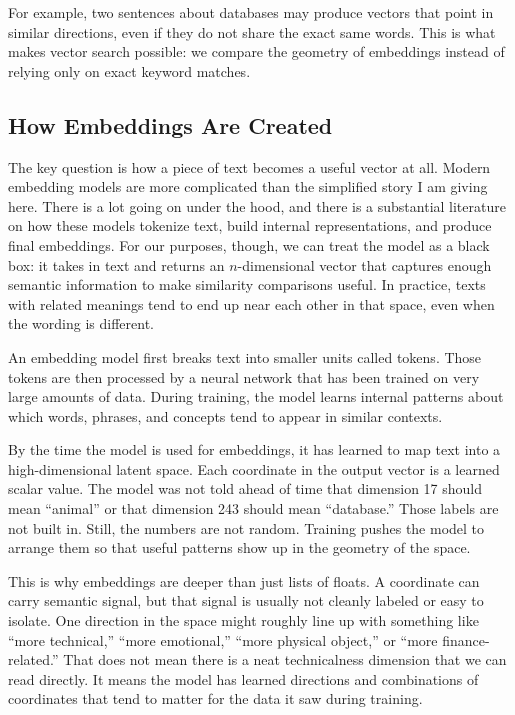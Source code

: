 \documentclass[12pt]{article}
\begin{document}
For example, two sentences about databases may produce vectors that point
in similar directions, even if they do not share the exact same words.
This is what makes vector search possible: we compare the geometry of
embeddings instead of relying only on exact keyword matches.

\subsection{How Embeddings Are Created}

The key question is how a piece of text becomes a useful vector at all.
Modern embedding models are more complicated than the simplified story I
am giving here. There is a lot going on under the hood, and there is a
substantial literature on how these models tokenize text, build internal
representations, and produce final embeddings. For our purposes, though,
we can treat the model as a black box: it takes in text and returns an
$n$-dimensional vector that captures enough semantic information to make
similarity comparisons useful. In practice, texts with related meanings
tend to end up near each other in that space, even when the wording is
different.

An embedding model first breaks text into smaller units called tokens.
Those tokens are then processed by a neural network that has been trained
on very large amounts of data. During training, the model learns internal
patterns about which words, phrases, and concepts tend to appear in
similar contexts.

By the time the model is used for embeddings, it has learned to map text
into a high-dimensional latent space. Each coordinate in the output vector
is a learned scalar value. The model was not told ahead of time that
dimension 17 should mean ``animal'' or that dimension 243 should mean
``database.'' Those labels are not built in. Still, the numbers are not
random. Training pushes the model to arrange them so that useful patterns
show up in the geometry of the space.

This is why embeddings are deeper than just lists of floats. A coordinate
can carry semantic signal, but that signal is usually not cleanly labeled
or easy to isolate. One direction in the space might roughly line up with
something like ``more technical,'' ``more emotional,'' ``more physical
object,'' or ``more finance-related.'' That does not mean there is a neat
technicalness dimension that we can read directly. It means the model has
learned directions and combinations of coordinates that tend to matter for
the data it saw during training.
\end{document}
